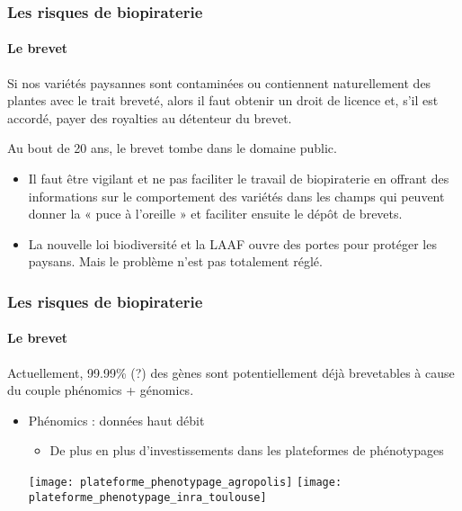 \begin{frame}
\frametitle{Les risques de biopiraterie}
\framesubtitle{Le brevet}


Si nos variétés paysannes sont contaminées ou contiennent naturellement des plantes avec le trait breveté, alors il faut obtenir un droit de licence et, s'il est accordé, payer des royalties au détenteur du brevet.

Au bout de 20 ans, le brevet tombe dans le domaine public.




\vfill


\begin{itemize}
\item Il faut être vigilant et ne pas faciliter le travail de biopiraterie en offrant des informations sur le comportement des variétés dans les champs qui peuvent donner la « puce à l'oreille » et faciliter ensuite le dépôt de brevets. 

\item La nouvelle loi biodiversité et la LAAF ouvre des portes pour protéger les paysans. 
Mais le problème n'est pas totalement réglé.

\end{itemize}

\end{frame}



\begin{frame}
\frametitle{Les risques de biopiraterie}
\framesubtitle{Le brevet}

Actuellement, 99.99\% (?) des gènes sont potentiellement déjà brevetables à cause 
du couple phénomics + génomics.

\begin{itemize}

\item Phénomics : données haut débit

	\begin{itemize}
	\item De plus en plus d'investissements dans les plateformes de phénotypages
	\end{itemize}

	\texttt{[image: plateforme\_phenotypage\_agropolis]}
	\hfill 
	\texttt{[image: plateforme\_phenotypage\_inra\_toulouse]}

\end{itemize}

\end{frame}


